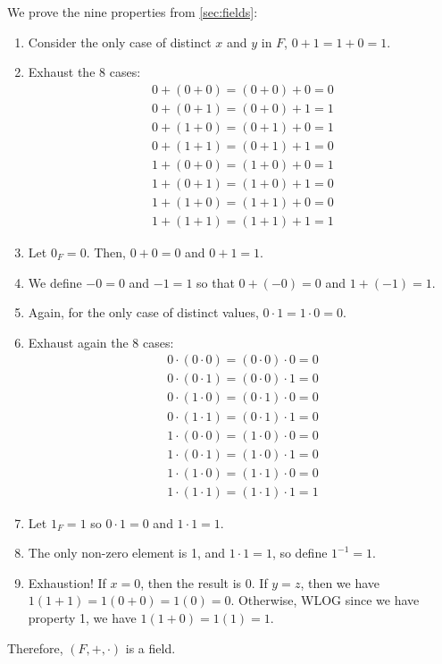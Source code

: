\begin{prf}
  We prove the nine properties from \cref{sec:fields}:
  \begin{enumerate}
    \item Consider the only case of distinct $x$ and $y$ in $F$, $0 + 1 = 1 + 0 = 1$.
    \item Exhaust the 8 cases:
          \begin{align*}
            0 + (0 + 0) = (0 + 0) + 0 = 0 \\
            0 + (0 + 1) = (0 + 0) + 1 = 1 \\
            0 + (1 + 0) = (0 + 1) + 0 = 1 \\
            0 + (1 + 1) = (0 + 1) + 1 = 0 \\
            1 + (0 + 0) = (1 + 0) + 0 = 1 \\
            1 + (0 + 1) = (1 + 0) + 1 = 0 \\
            1 + (1 + 0) = (1 + 1) + 0 = 0 \\
            1 + (1 + 1) = (1 + 1) + 1 = 1
          \end{align*}
    \item Let $0_F=0$. Then, $0 + 0 = 0$ and $0 + 1 = 1$.
    \item We define $-0 = 0$ and $-1 = 1$ so that $0 + (-0) = 0$ and $1 + (-1) = 1$.
    \item Again, for the only case of distinct values, $0 \cdot 1 = 1 \cdot 0 = 0$.
    \item Exhaust again the 8 cases:
          \begin{align*}
            0 \cdot (0 \cdot 0) = (0 \cdot 0) \cdot 0 = 0 \\
            0 \cdot (0 \cdot 1) = (0 \cdot 0) \cdot 1 = 0 \\
            0 \cdot (1 \cdot 0) = (0 \cdot 1) \cdot 0 = 0 \\
            0 \cdot (1 \cdot 1) = (0 \cdot 1) \cdot 1 = 0 \\
            1 \cdot (0 \cdot 0) = (1 \cdot 0) \cdot 0 = 0 \\
            1 \cdot (0 \cdot 1) = (1 \cdot 0) \cdot 1 = 0 \\
            1 \cdot (1 \cdot 0) = (1 \cdot 1) \cdot 0 = 0 \\
            1 \cdot (1 \cdot 1) = (1 \cdot 1) \cdot 1 = 1
          \end{align*}
    \item Let $1_F=1$ so $0 \cdot 1 = 0$ and $1 \cdot 1 = 1$.
    \item The only non-zero element is 1, and $1 \cdot 1 = 1$, so define $1^{-1} = 1$.
    \item Exhaustion! If $x=0$, then the result is 0.
          If $y = z$, then we have $1(1 + 1) = 1(0 + 0) = 1(0) = 0$.
          Otherwise, WLOG since we have property 1, we have $1(1 + 0) = 1(1) = 1$.
  \end{enumerate}
  Therefore, $(F,+,\cdot)$ is a field.
\end{prf}

